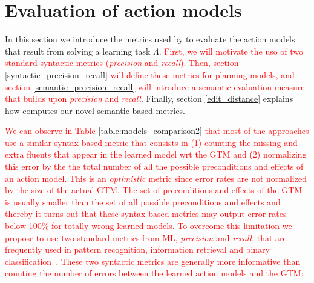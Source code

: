 
\section{Evaluation of action models}
\label{sec:evaluation}

In this section we introduce the metrics used by \FAMA to evaluate the action models that result from solving a learning task $\Lambda$. \textcolor{red}{First, we will motivate the uso of two standard syntactic metrics ({\em precision} and {\em recall}). Then, section \ref{syntactic_precision_recall} will define these metrics for planning models, and section \ref{semantic_precision_recall} will introduce a semantic evaluation measure that builds upon {\em precision} and {\em recall}}. Finally, section \ref{edit_distance} explains how \FAMA computes our novel semantic-based metrics.


\textcolor{red}{We can observe in Table \ref{table:models_comparison2} that most of the approaches use a similar syntax-based metric that consists in (1) counting the missing and extra fluents that appear in the learned model wrt the GTM and (2) normalizing this error by the the total number of all the possible preconditions and effects of an action model. This is an \emph{optimistic} metric since error rates are not normalized by the size of the actual GTM. The set of preconditions and effects of the GTM is usually smaller than the set of all possible preconditions and effects and thereby it turns out that these syntax-based metrics may output error rates below 100\% for totally wrong learned models. To overcome this limitation we propose to use two standard metrics from ML, {\em precision} and {\em recall}, that are frequently used in pattern recognition, information retrieval and binary classification~\cite{davis2006relationship}. These two syntactic metrics are generally more informative than counting the number of errors between the learned action models and the GTM:}



